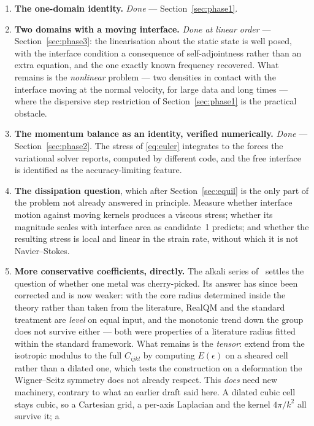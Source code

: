 \documentclass[11pt]{article}
\begin{document}
\begin{enumerate}\itemsep4pt
\item[\textbf{0.}] \textbf{The one-domain identity.} \emph{Done} --- Section~\ref{sec:phase1}.
\item \textbf{Two domains with a moving interface.} \emph{Done at linear order} ---
Section~\ref{sec:phase3}: the linearisation about the static state is well posed, with the interface
condition a consequence of self-adjointness rather than an extra equation, and the one exactly known
frequency recovered. What remains is the \emph{nonlinear} problem --- two densities in contact with
the interface moving at the normal velocity, for large data and long times --- where the dispersive
step restriction of Section~\ref{sec:phase1} is the practical obstacle.
\item \textbf{The momentum balance as an identity, verified numerically.} \emph{Done} ---
Section~\ref{sec:phase2}. The stress of \eqref{eq:euler} integrates to the forces the variational
solver reports, computed by different code, and the free interface is identified as the
accuracy-limiting feature.
\item \textbf{The dissipation question}, which after Section~\ref{sec:equil} is the only part of
the problem not already answered in principle. Measure whether interface motion against moving
kernels produces a viscous stress; whether its magnitude scales with interface area as candidate~1
predicts; and whether the resulting stress is local and linear in the strain rate, without which it
is not Navier--Stokes.
\item \textbf{More conservative coefficients, directly.} The alkali series of~\cite{elasticity}
settles the question of whether one metal was cherry-picked. Its answer has since been corrected and
is now weaker: with the core radius determined inside the theory rather than taken from the
literature, RealQM and the standard treatment are \emph{level} on equal input, and the monotonic
trend down the group does not survive either --- both were properties of a literature radius fitted
within the standard framework. What remains is the \emph{tensor}: extend from the isotropic modulus
to the full $C_{ijkl}$ by computing $E(\epsilon)$ on a sheared cell rather than a dilated one, which
tests the construction on a deformation the Wigner--Seitz symmetry does not already respect. This
\emph{does} need new machinery, contrary to what an earlier draft said here. A dilated cubic cell
stays cubic, so a Cartesian grid, a per-axis Laplacian and the kernel $4\pi/k^2$ all survive it; a

\end{enumerate}
\end{document}
